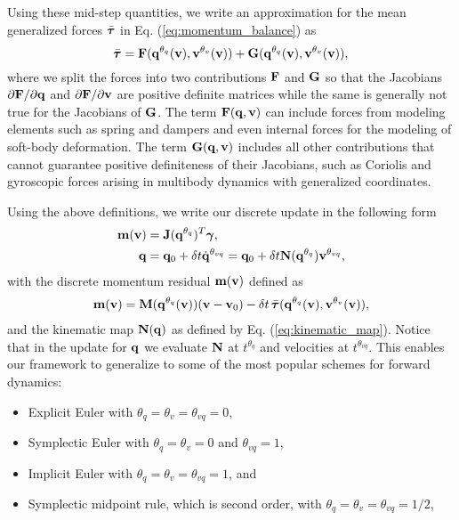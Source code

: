 Using these mid-step quantities, we write an approximation for the mean
generalized forces $\bar{{\bm{\tau}}}$ in Eq. (\ref{eq:momentum_balance}) as
\begin{equation}
	\bar{{\bm{\tau}}} = {\mathbf{F}}({\mathbf{q}}^{\theta_{q}}({\mathbf{v}}), {\mathbf{v}}^{\theta_v}({\mathbf{v}}))+
	{\mathbf{G}}({\mathbf{q}}^{\theta_{q}}({\mathbf{v}}), {\mathbf{v}}^{\theta_v}({\mathbf{v}})),
\end{equation}
where we split the forces into two contributions ${\mathbf{F}}$ and ${\mathbf{G}}$ so that
the Jacobians $\partial {\mathbf{F}}/\partial{\mathbf{q}}$ and $\partial
{\mathbf{F}}/\partial{\mathbf{v}}$ are positive definite matrices while the same is
generally not true for the Jacobians of ${\mathbf{G}}$. The term ${\mathbf{F}}({\mathbf{q}},
{\mathbf{v}})$ can include forces from modeling elements such as spring and dampers and even
internal forces for the modeling of soft-body deformation. The term
${\mathbf{G}}({\mathbf{q}}, {\mathbf{v}})$ includes all other contributions that cannot guarantee
positive definiteness of their Jacobians, such as Coriolis and gyroscopic forces
arising in multibody dynamics with generalized coordinates.

Using the above definitions, we write our discrete update in the following form
\begin{align}
	\mf{m}(\mf{v}) &= \mf{J}(\mf{q}^{\theta_{q}})^T\mf{\bgamma},
	\label{eq:v_update}\\
	\mf{q} &= \mf{q}_0 + \delta t \dot{\mf{q}}^{\theta_{vq}} = \mf{q}_0 + \delta t\mf{N}(\mf{q}^{\theta_{q}})\mf{v}^{\theta_{vq}},
	\label{eq:q_update}
\end{align}
with the discrete momentum residual ${\mathbf{m}}({\mathbf{v}})$ defined as
\begin{multline}
	\mf{m}(\mf{v}) =
	\mf{M}(\mf{q}^{\theta_{q}}(\mf{v}))(\mf{v}-\mf{v}_0) -
	\delta t\,\bar{\vf{\tau}}(\mf{q}^{\theta_{q}}(\mf{v}), \mf{v}^{\theta_v}(\mf{v})),
	\label{eq:m_definition}
\end{multline}
and the kinematic map ${\mathbf{N}}({\mathbf{q}})$ as defined by Eq.
(\ref{eq:kinematic_map}). Notice that in the update for ${\mathbf{q}}$ we evaluate
${\mathbf{N}}$ at $t^{\theta_{q}}$ and velocities at $t^{\theta_{vq}}$. This enables
our framework to generalize to some of the most popular schemes for forward
dynamics:
\begin{itemize}
	\item Explicit Euler with $\theta_q=\theta_{v}=\theta_{vq} = 0$,
	\item Symplectic Euler with $\theta_{q} = \theta_v = 0$ and $\theta_{vq}=1$,
	\item Implicit Euler with $\theta_{q} = \theta_v = \theta_{vq}= 1$, and
	\item Symplectic midpoint rule, which is second order, with $\theta_{q} =
	\theta_v = \theta_{vq}= 1/2$,
\end{itemize}

